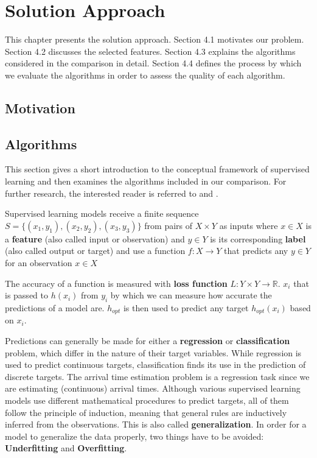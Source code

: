 

\chapter{Solution Approach}
This chapter presents the solution approach.
Section 4.1 motivates our problem. 
Section 4.2 discusses the selected features.
Section 4.3 explains the algorithms considered in the comparison in detail.
Section 4.4 defines the process by which we evaluate the algorithms in order to assess the quality of each algorithm.

\section{Motivation}

\section{Algorithms}
This section gives a short introduction to the conceptual framework of supervised learning and then examines the algorithms included in our comparison. For further research, the interested reader is referred to \cite{Bishop} and \cite{SLFoundations}.

Supervised learning models receive a finite sequence 
$S = \{(x_1, y_1), (x_2,y_2), (x_3,y_3)\}$ from pairs of $X \times Y$ as inputs where $x \in X$ is a \textbf{feature} (also called input or observation) and $y \in Y$ is its corresponding \textbf{label} (also called output or target) and use a function $f : X \to Y$ that predicts any $y \in Y$ for an observation $x \in X$


The accuracy of a function is measured with \textbf{loss function} $L: Y \times Y \to \mathbb{R}$. $x_i$ that is passed to $h(x_i)$ from $y_i$ by which we can measure how accurate the predictions of a model are. $h_{opt}$ is then used to predict any target $h_{opt}(x_i)$ based on $x_i$.  

Predictions can generally be made for either a \textbf{regression} or \textbf{classification} problem, which differ in the nature of their target variables. While regression is used to predict continuous targets, classification finds its use in the prediction of discrete targets. The arrival time estimation problem is a regression task since we are estimating (continuous) arrival times.
Although various supervised learning models use different mathematical procedures to predict targets, all of them follow the principle of induction, meaning that general rules are inductively inferred from the observations. This is also called \textbf{generalization}.  
In order for a model to generalize the data properly, two things have to be avoided: \textbf{Underfitting} and \textbf{Overfitting}.



